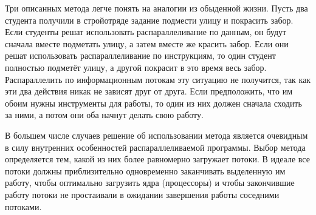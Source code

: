 Три описанных метода легче понять на аналогии из обыденной жизни. Пусть два студента получили в стройотряде задание подмести улицу и покрасить забор. Если студенты решат использовать распараллеливание по данным, он будут сначала вместе подметать улицу, а затем вместе же красить забор. Если они решат использовать распараллеливание по инструкциям, то один студент полностью подметёт улицу, а другой покрасит в это время весь забор. Распараллелить по информационным потокам эту ситуацию не получится, так как эти два действия никак не зависят друг от друга. Если предположить, что им обоим нужны инструменты для работы, то один из них должен сначала сходить за ними, а потом они оба начнут делать свою работу.

В большем числе случаев решение об использовании метода является очевидным в силу внутренних особенностей распараллеливаемой программы. Выбор метода определяется тем, какой из них более равномерно загружает потоки. В идеале все потоки должны приблизительно одновременно заканчивать выделенную им работу, чтобы оптимально загрузить ядра (процессоры) и чтобы закончившие работу потоки не простаивали в ожидании завершения работы соседними потоками.

